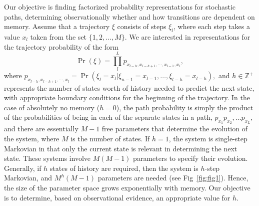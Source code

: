 \documentclass[prl,twocolumn,groupedaddress]{revtex4-1}
\renewcommand{\bf}[1]{\textbf{#1}}
\begin{document}
 Our objective is finding factorized probability representations for stochastic paths, determining observationally whether and how transitions  are  dependent on memory. Assume that a trajectory $\xi$ consists of steps $\xi_l$, where each step takes  a value $x_l$ taken from the set $\{1,2,\ldots,M\}.$ We are interested in representations for the trajectory probability of the  form
%
\begin{equation}
\Pr(\xi) = \prod_{l}^L p_{x_{l-h},x_{l-h+1},\cdots,x_{l-1},x_l}, 
\label{eq:factorize}
\end{equation}
%
where $p_{x_{l-h},x_{l-h+1},\cdots,x_l} =  \Pr(\xi_l = x_l | \xi_{n-1} = x_{l-1}, \ldots, \xi_{l-h} = x_{l-h} ),$ and $h\in\mathbb{Z}^+$ represents the number of states worth of history needed to predict the next state, with appropriate boundary conditions for the beginning of the trajectory. In the case of absolutely no memory ($h=0$), the path probability is simply the product of the probabilities of being in each of the separate states in a path, $p_{x_1}p_{x_2},\ldots p_{x_L},$ and there are essentially $M-1$ free parameters that determine the evolution of the system, where $M$ is the number of states. If $h=1$, the system is single-step Markovian in that only the current state is relevant in determining the next state. These systems involve $M(M-1)$ parameters to specify their evolution. Generally, if $h$ states of history are required, then the system is $h$-step Markovian, and $M^h(M-1)$ parameters are needed (see Fig~\ref{fig:fig1}). Hence, the size of the parameter space grows exponentially with memory. Our objective is to determine, based on observational evidence, an appropriate value for $h$. 

 
 
\end{document}
